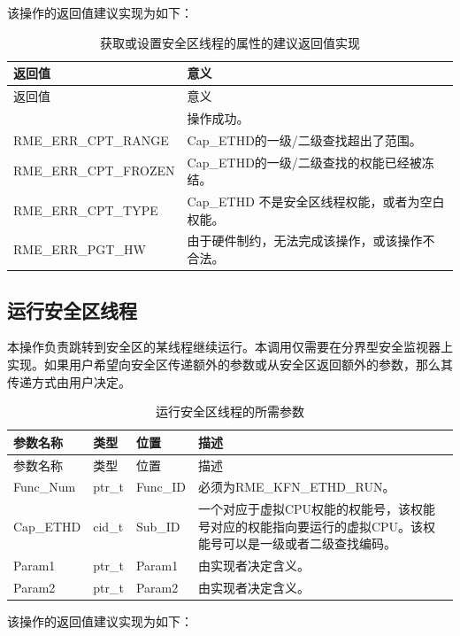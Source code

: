 该操作的返回值建议实现为如下：

\begin{xltabular}{\textwidth}{@{}>{\hsize\raggedright\arraybackslash}X>{\hsize\raggedright\arraybackslash}X@{}}
\caption{获取或设置安全区线程的属性的建议返回值实现}\label{tab:8-105-get-or-set-enclave-thread-attributes-suggested-return-values}\\
\toprule
返回值 & 意义\tabularnewline
\endfirsthead
\toprule
返回值 & 意义\tabularnewline
\midrule
\endhead
\bottomrule
{} & 操作成功。\tabularnewline
    RME\_ERR\_CPT\_RANGE & Cap\_ETHD的一级/二级查找超出了范围。\tabularnewline
    RME\_ERR\_CPT\_FROZEN & Cap\_ETHD的一级/二级查找的权能已经被冻结。\tabularnewline
    RME\_ERR\_CPT\_TYPE & Cap\_ETHD 不是安全区线程权能，或者为空白权能。\tabularnewline
    
    RME\_ERR\_PGT\_HW & 由于硬件制约，无法完成该操作，或该操作不合法。\tabularnewline
\end{xltabular}

\subsection{运行安全区线程}\label{subsec:8-run-enclave-thread}

本操作负责跳转到安全区的某线程继续运行。本调用仅需要在分界型安全监视器上实现。如果用户希望向安全区传递额外的参数或从安全区返回额外的参数，那么其传递方式由用户决定。

\begin{xltabular}{\textwidth}{@{}>{\hsize\raggedright\arraybackslash}X>{\hsize\raggedright\arraybackslash}X>{\hsize\raggedright\arraybackslash}X>{\hsize\raggedright\arraybackslash}X@{}}
\caption{运行安全区线程的所需参数}\label{tab:8-106-run-enclave-thread-parameters}\\
\toprule
参数名称 & 类型 & 位置 & 描述\tabularnewline
\endfirsthead
\toprule
参数名称 & 类型 & 位置 & 描述\tabularnewline
\midrule
\endhead
\bottomrule
\endlastfoot
Func\_Num & ptr\_t & Func\_ID &
必须为RME\_KFN\_ETHD\_RUN。\tabularnewline
Cap\_ETHD & cid\_t & Sub\_ID &
一个对应于虚拟CPU权能的权能号，该权能号对应的权能指向要运行的虚拟CPU。该权能号可以是一级或者二级查找编码。\tabularnewline
Param1 & ptr\_t & Param1 & 由实现者决定含义。\tabularnewline
Param2 & ptr\_t & Param2 & 由实现者决定含义。\tabularnewline
\end{xltabular}

该操作的返回值建议实现为如下：

